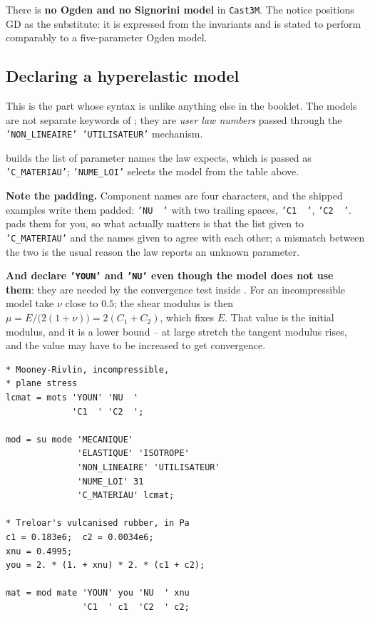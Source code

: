 \noindent There is \textbf{no Ogden and no Signorini model} in
\texttt{Cast3M}. The notice positions GD as the substitute: it is expressed
from the invariants and is stated to perform comparably to a five-parameter
Ogden model.

\subsection*{Declaring a hyperelastic model}

%
%
This is the part whose syntax is unlike anything else in the booklet. The
models are not separate keywords of ; they are \emph{user law
numbers} passed through the \texttt{'NON\_LINEAIRE' 'UTILISATEUR'} mechanism.

\begin{castemcom}
 builds the list of parameter names the law expects, which is passed
as \texttt{'C\_MATERIAU'}; \texttt{'NUME\_LOI'} selects the model from the
table above.

\medskip
\textbf{Note the padding.} Component names are four characters, and the
shipped examples write them padded: \texttt{'NU~~'} with two trailing
spaces, \texttt{'C1~~'}, \texttt{'C2~~'}.  pads them for you, so
what actually matters is that the list given to \texttt{'C\_MATERIAU'} and
the names given to  agree with each other; a mismatch between the
two is the usual reason the law reports an unknown parameter.

\textbf{And declare \texttt{'YOUN'} and \texttt{'NU'} even though the model
does not use them}: they are needed by the convergence test inside
. For an incompressible model take $\nu$ close to $0.5$; the
shear modulus is then $\mu = E/\bigl(2(1+\nu)\bigr) = 2(C_{1}+C_{2})$, which
fixes $E$.
That value is the initial modulus, and it is a lower bound -- at large
stretch the tangent modulus rises, and the value may have to be increased to
get convergence.
\end{castemcom}
\begin{castemlines}
\begin{verbatim}
* Mooney-Rivlin, incompressible,
* plane stress
lcmat = mots 'YOUN' 'NU  '
             'C1  ' 'C2  ';

mod = su mode 'MECANIQUE'
              'ELASTIQUE' 'ISOTROPE'
              'NON_LINEAIRE' 'UTILISATEUR'
              'NUME_LOI' 31
              'C_MATERIAU' lcmat;

* Treloar's vulcanised rubber, in Pa
c1 = 0.183e6;  c2 = 0.0034e6;
xnu = 0.4995;
you = 2. * (1. + xnu) * 2. * (c1 + c2);

mat = mod mate 'YOUN' you 'NU  ' xnu
               'C1  ' c1  'C2  ' c2;
\end{verbatim}
\end{castemlines}

